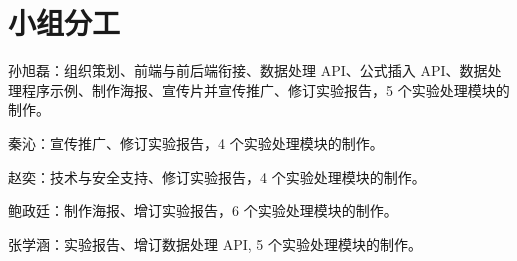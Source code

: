 \section{小组分工}

孙旭磊：组织策划、前端与前后端衔接、数据处理 API、公式插入 API、数据处理程序示例、制作海报、宣传片并宣传推广、修订实验报告，5 个实验处理模块的制作。

秦沁：宣传推广、修订实验报告，4 个实验处理模块的制作。

赵奕：技术与安全支持、修订实验报告，4 个实验处理模块的制作。

鲍政廷：制作海报、增订实验报告，6 个实验处理模块的制作。

张学涵：实验报告、增订数据处理 API, 5 个实验处理模块的制作。